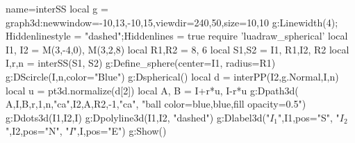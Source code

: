 \documentclass[12pt]{standalone}
\begin{document}
\begin{luadraw}{name=interSS}
local g = graph3d:new{window={-10,13,-10,15},viewdir={240,50},size={10,10}}
 g:Linewidth(4); Hiddenlinestyle = "dashed";Hiddenlines = true
require 'luadraw_spherical'
local I1, I2 = M(3,-4,0), M(3,2,8)
local R1,R2 = 8, 6
local S1,S2 = {I1, R1},{I2, R2}
local I,r,n = interSS(S1, S2)
g:Define_sphere({center=I1, radius=R1}) 
g:DScircle({I,n},{color="Blue"})
g:Dspherical()
local d = interPP({I2,g.Normal},{I,n})
local u = pt3d.normalize(d[2])
local A, B = I+r*u, I-r*u
g:Dpath3d( {A,I,B,r,1,n,"ca",I2,A,R2,-1,"ca"}, "ball color=blue,blue,fill opacity=0.5")
g:Ddots3d({I1,I2,I})
g:Dpolyline3d({I1,I2}, "dashed")
g:Dlabel3d("$I_1$",I1,{pos="S"}, "$I_2$",I2,{pos="N"}, "$I$",I,{pos="E"})
g:Show()
\end{luadraw} 
\end{document}
